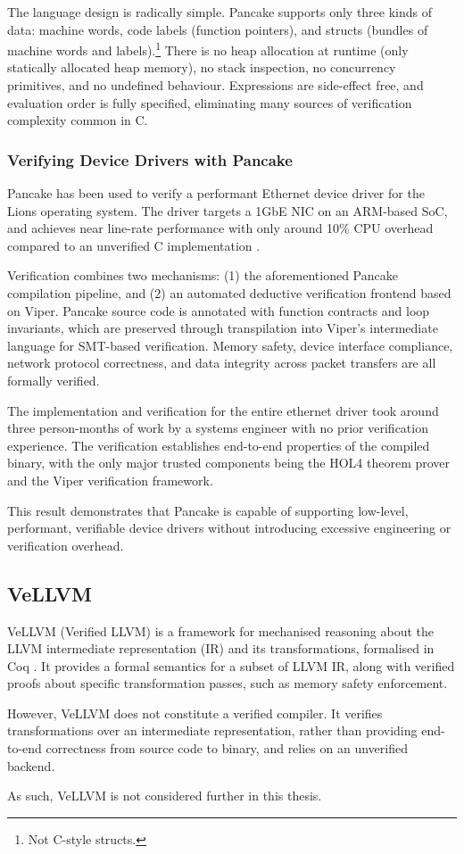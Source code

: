 The language design is radically simple. Pancake supports only three kinds of data: machine words, code labels (function pointers), and structs (bundles of machine words and labels).\footnote{Not C-style structs.} There is no heap allocation at runtime (only statically allocated heap memory), no stack inspection, no concurrency primitives, and no undefined behaviour. Expressions are side-effect free, and evaluation order is fully specified, eliminating many sources of verification complexity common in C.

\subsubsection{Verifying Device Drivers with Pancake}

Pancake has been used to verify a performant Ethernet device driver for the Lions operating system. The driver targets a 1GbE NIC on an ARM-based SoC, and achieves near line-rate performance with only around 10\% CPU overhead compared to an unverified C implementation \citep{zhao2025verifyingdevicedriverspancake}.

Verification combines two mechanisms: (1) the aforementioned Pancake compilation pipeline, and (2) an automated deductive verification frontend based on Viper. Pancake source code is annotated with function contracts and loop invariants, which are preserved through transpilation into Viper’s intermediate language for SMT-based verification. Memory safety, device interface compliance, network protocol correctness, and data integrity across packet transfers are all formally verified.

The implementation and verification for the entire ethernet driver took around three person-months of work by a systems engineer with no prior verification experience. The verification establishes end-to-end properties of the compiled binary, with the only major trusted components being the HOL4 theorem prover and the Viper verification framework.

This result demonstrates that Pancake is capable of supporting low-level, performant, verifiable device drivers without introducing excessive engineering or verification overhead.

\subsection{VeLLVM}
VeLLVM (Verified LLVM) is a framework for mechanised reasoning about the LLVM intermediate representation (IR) and its transformations, formalised in Coq \citep{zhao2012vellvm}. It provides a formal semantics for a subset of LLVM IR, along with verified proofs about specific transformation passes, such as memory safety enforcement.

However, VeLLVM does not constitute a verified compiler. It verifies transformations over an intermediate representation, rather than providing end-to-end correctness from source code to binary, and relies on an unverified backend.

As such, VeLLVM is not considered further in this thesis.




